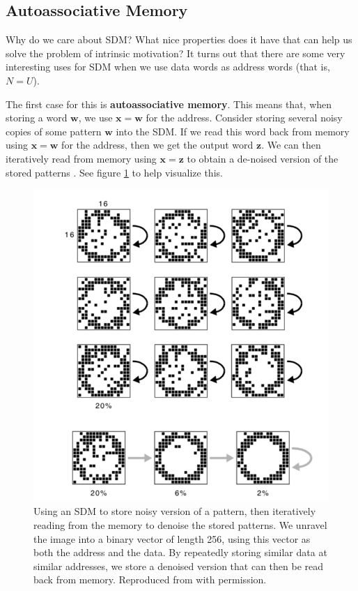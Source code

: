 \documentclass[journal, onecolumn, 12pt, draftclsnofoot]{IEEEtran}
\newcommand{\kword}[1]{\textbf{#1}}
\newcommand{\mbf}[1]{\mathbf{#1}}
\begin{document}
	\subsection{Autoassociative Memory}
	\par Why do we care about SDM? What nice properties does it have that can help us solve the problem of intrinsic motivation? It turns out that there are some very interesting uses for SDM when we use data words as address words (that is, $N = U$).
	\par The first case for this is \kword{autoassociative memory}. This means that, when storing a word $\mbf{w}$, we use $\mbf{x} = \mbf{w}$ for the address. Consider storing several noisy copies of some pattern $\mbf{w}$ into the SDM. If we read this word back from memory using $\mbf{x} = \mbf{w}$ for the address, then we get the output word $\mbf{z}$. We can then iteratively read from memory using $\mbf{x} = \mbf{z}$ to obtain a de-noised version of the stored patterns \cite{sdm}. See figure \ref{fig:SDM-denoise-iterative-retrieval} to help visualize this.
	\begin{figure}[ht]
		\begin{center}
		\includegraphics[scale=0.6]{fig/sdm-iterative-retrieval.png}
	\end{center}
		\caption{Using an SDM to store noisy version of a pattern, then iteratively reading from the memory to denoise the stored patterns. We unravel the image into a binary vector of length 256, using this vector as both the address and the data. By repeatedly storing similar data at similar addresses, we store a denoised version that can then be read back from memory. Reproduced from \cite{sdm} with permission.}
		\label{fig:SDM-denoise-iterative-retrieval}
	\end{figure}
\end{document}
